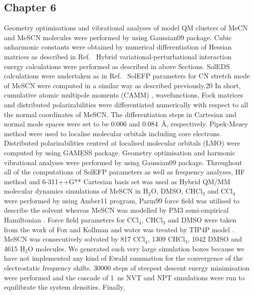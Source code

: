 \documentclass[b5paper,oneside,fleqn,11pt]{book}
\begin{document}
\begin{appendices}
\begin{refsection}
\section{Chapter 6}

Geometry optimisations and vibrational analyses of model QM clusters of MeCN and
MeSCN molecules were performed by using Gaussian09 package. Cubic anharmonic
constants \citep{Barone.JCP.2005} were obtained by numerical differentiation of Hessian matrices as
described in Ref.~\citep{Blasiak.Cho.JCP.2015} 
Hybrid variational\hyp{}perturbational interaction energy calculations
were performed as described in above Sections. SolEDS
calculations were undertaken as in Ref.~\citep{Blasiak.Cho.JCP.2015} 
SolEFP parameters for CN stretch mode of
MeSCN were computed in a similar way as described previously.20 In short, cumulative
atomic multipole moments (CAMM) \citep{Sokalski.Poirier.CPL.1983}, 
wavefunctions, Fock matrices and distributed
polarizabilities were differentiated numerically with respect to all the normal
coordinates of MeSCN. The differentiation steps in Cartesian and normal mode spaces
were set to be 0.006 and 0.084~\AA, respectively. Pipek-Mezey method were used to
localise molecular orbitals including core electrons. Distributed polarizabilities centred
at localised molecular orbitals (LMO) were computed by using {\sc GAMESS} package.
Geometry optimisation and harmonic vibrational analyses were performed by using
{\sc Gaussian09} package. Throughout all of the computations of SolEFP parameters as well
as frequency analyses, HF method and 6-311++G** Cartesian basis set was used as
Hybrid QM/MM molecular dynamics simulations of MeSCN in H$_2$O, DMSO, CHCl$_3$ and
CCl$_4$ were performed by using {\sc Amber11} program, Parm99 force field \citep{Wang.Cieplak.Kollman.JCC.2000}
was utilised to
describe the solvent whereas MeSCN was modelled by PM3 semi\hyp{}empirical
Hamiltonian \citep{Stewart.JCC.1988}. Force field parameters for CCl$_4$, CHCl$_3$ and DMSO were taken from the
work of Fox and Kollman \citep{Fox.Kollman.JPCB.1998} and water was treated 
by TIP4P model \citep{Jorgensen.Chandrasekhar.Madura.Impey.Klein.JCP.1983}. MeSCN was
consecutively solvated by 817 CCl$_4$, 1309 CHCl$_3$, 1042 DMSO and 4615 H$_2$O molecules.
We generated such very large simulation boxes because we have not implemented any
kind of Ewald summation for the convergence of the electrostatic frequency shifts.
30000 steps of steepest descent energy minimisation were performed and the cascade
of 1~ns NVT and NPT simulations were run to equilibrate the system densities. Finally, 

\end{refsection}
\end{appendices}
\end{document}
